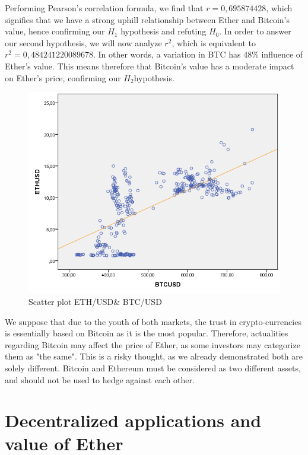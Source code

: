\documentclass[11pt]{report}
\begin{document}
Performing Pearson's correlation formula, we find that $r = 0,695874428$, which signifies that we have a strong uphill relationship between Ether and Bitcoin's value, hence confirming our \textbf{$H_1$} hypothesis and refuting \textbf{$H_0$}.
In order to answer our second hypothesis, we will now analyze $r^2$, which is equivalent to 
$r^2=0,484241220089678$. In other words, a variation in BTC has 48\% influence of Ether's value. This means therefore that Bitcoin's value has a moderate impact on Ether's price, confirming our \textbf{$H_2$}hypothesis.

\begin{figure}[!h]
\centering
\includegraphics[scale=0.5]{Chap5/ScatterplotETHUSDBTCUSD}\medbreak
\centering
\caption{Scatter plot ETH/USD\& BTC/USD}
\label{SCATTER}
\end{figure}
\smallbreak

We suppose that due to the youth of both markets, the trust in crypto-currencies is essentially based on Bitcoin as it is the most popular. Therefore, actualities regarding Bitcoin may affect the price of Ether, as some investors may categorize them as "the same". This is a risky thought, as we already demonstrated both are solely different. Bitcoin and Ethereum must be considered as two different assets, and should not be used to hedge against each other.

\clearpage	
 \section{Decentralized applications and value of Ether}
 
\end{document}
